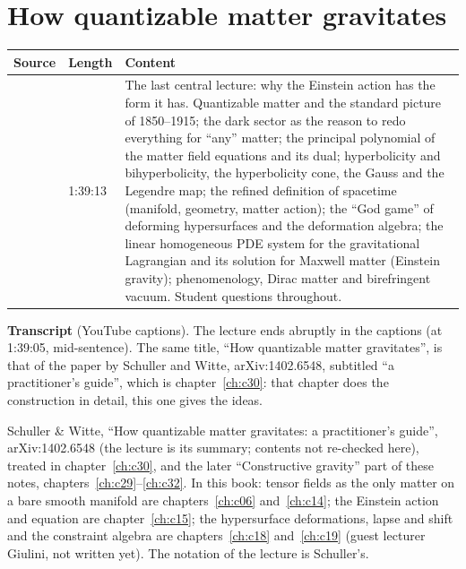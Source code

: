\chapter{How quantizable matter gravitates}\label{ch:c26}
\begin{paracol}{2}

\begin{sources}
\begin{tabularx}{\linewidth}{@{}l l L@{}}
\toprule
\textbf{Source} & \textbf{Length} & \textbf{Content}\\
\midrule
{} & 1:39:13 & The last central lecture: why the Einstein action has the form it has. Quantizable matter and the standard picture of 1850--1915; the dark sector as the reason to redo everything for ``any'' matter; the principal polynomial of the matter field equations and its dual; hyperbolicity and bihyperbolicity, the hyperbolicity cone, the Gauss and the Legendre map; the refined definition of spacetime (manifold, geometry, matter action); the ``God game'' of deforming hypersurfaces and the deformation algebra; the linear homogeneous PDE system for the gravitational Lagrangian and its solution for Maxwell matter (Einstein gravity); phenomenology, Dirac matter and birefringent vacuum. Student questions throughout.\\
\bottomrule
\end{tabularx}

\smallskip
\textbf{Transcript}  (YouTube captions). The lecture ends abruptly in the captions (at 1:39:05, mid-sentence). The same title, ``How quantizable matter gravitates'', is that of the paper by Schuller and Witte, arXiv:1402.6548, subtitled ``a practitioner's guide'', which is chapter~\ref{ch:c30}: that chapter does the construction in detail, this one gives the ideas.
\end{sources}

\begin{reading}
Schuller \& Witte, ``How quantizable matter gravitates: a practitioner's guide'', arXiv:1402.6548 (the lecture is its summary; contents not re-checked here), treated in chapter~\ref{ch:c30}, and the later ``Constructive gravity'' part of these notes, chapters~\ref{ch:c29}--\ref{ch:c32}. In this book: tensor fields as the only matter on a bare smooth manifold are chapters~\ref{ch:c06} and~\ref{ch:c14}; the Einstein action and equation are chapter~\ref{ch:c15}; the hypersurface deformations, lapse and shift and the constraint algebra are chapters~\ref{ch:c18} and~\ref{ch:c19} (guest lecturer Giulini, not written yet). The notation of the lecture is Schuller's.
\end{reading}


\end{paracol}
